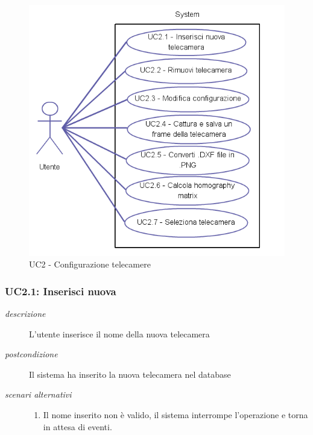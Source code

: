 \begin{figure}[htpb] 

\centering 

\includegraphics[scale=0.4]{./images/uc2.png} 

\caption{UC2 - Configurazione telecamere} 

\label{fig:uc2}

\end{figure} 

\subsubsection{UC2.1: Inserisci nuova} \label{sec:UC2.1}
\begin{description}
\item[\em{descrizione }]L'utente inserisce il nome della nuova telecamera
\item[\em{postcondizione }] Il sistema ha inserito la nuova telecamera nel database
\item[\em{scenari alternativi }] \mbox{}

  \begin{enumerate}
\item Il nome inserito non è valido, il sistema interrompe l'operazione e torna in attesa di eventi.
\end{enumerate}
\end{description}

